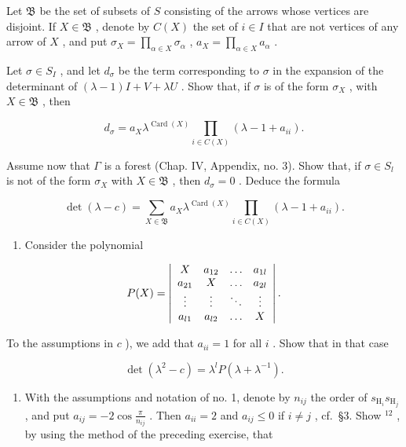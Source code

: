Let \(\mathfrak{B}\) be the set of subsets of \(S\) consisting of the arrows whose vertices are disjoint. If \(X \in \mathfrak{B}\) , denote by \(C(X)\) the set of \(i \in I\) that are not vertices of any arrow of \(X\) , and put \(\sigma_X = \prod_{\alpha \in X} \sigma_\alpha\) , \(a_X = \prod_{\alpha \in X} a_\alpha\) .

Let \(\sigma \in S_{I}\) , and let \(d_{\sigma}\) be the term corresponding to \(\sigma\) in the expansion of the determinant of \((\lambda - 1)I + V + \lambda U\) . Show that, if \(\sigma\) is of the form \(\sigma_{X}\) , with \(X \in \mathfrak{B}\) , then

\[
d _ {\sigma} = a _ {X} \lambda^ {\operatorname{Card} (X)} \prod_ {i \in C (X)} (\lambda - 1 + a _ {i i}).
\]

Assume now that \(\Gamma\) is a forest (Chap. IV, Appendix, no. 3). Show that, if \(\sigma \in S_l\) is not of the form \(\sigma_X\) with \(X \in \mathfrak{B}\) , then \(d_{\sigma} = 0\) . Deduce the formula

\[
\det (\lambda - c) = \sum_ {X \in \mathfrak {B}} a _ {X} \lambda^ {\operatorname{Card} (X)} \prod_ {i \in C (X)} (\lambda - 1 + a _ {i i}).
\]

\begin{enumerate}
\def\labelenumi{\alph{enumi})}
\setcounter{enumi}{3}
\tightlist
\item
  Consider the polynomial
\end{enumerate}

\[
P (X) = \left| \begin{array}{c c c c} X & a _ {1 2} & \ldots & a _ {1 l} \\ a _ {2 1} & X & \ldots & a _ {2 l} \\ \vdots & \vdots & \ddots & \vdots \\ a _ {l 1} & a _ {l 2} & \ldots & X \end{array} \right|.
\]

To the assumptions in \(c\) ), we add that \(a_{ii} = 1\) for all \(i\) . Show that in that case

\[
\det (\lambda^ {2} - c) = \lambda^ {l} P (\lambda + \lambda^ {- 1}).
\]

\begin{enumerate}
\def\labelenumi{\arabic{enumi})}
\setcounter{enumi}{3}
\tightlist
\item
  With the assumptions and notation of no. 1, denote by \(n_{ij}\) the order of \(s_{\mathrm{H}_i}s_{\mathrm{H}_j}\) , and put \(a_{ij} = -2\cos \frac{\pi}{n_{ij}}\) . Then \(a_{ii} = 2\) and \(a_{ij} \leqslant 0\) if \(i \neq j\) , cf.~§3. Show \(^{12}\) , by using the method of the preceding exercise, that
\end{enumerate}

